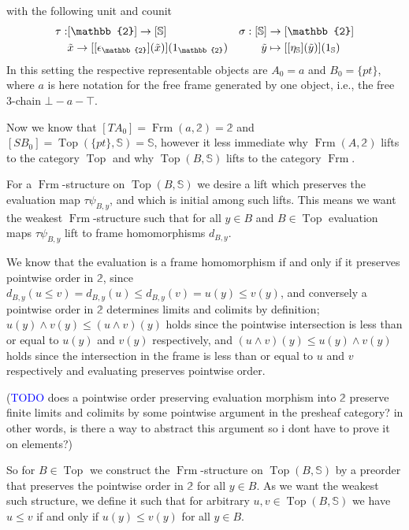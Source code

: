 \documentclass[12pt,a4paper]{article}
\DeclareMathOperator{\Frm}{Frm}
\DeclareMathOperator{\Top}{Top}
\def\t{\ensuremath\tilde}
\begin{document}
with the following unit and counit
\begin{align*}
	\tau:& [\mathbb{2}] \to [\mathbb{S}] & \sigma: [\mathbb{S}]&\to [\mathbb{2}]\\
	&\t x \to  [[\epsilon_{\mathbb{2}}](\t x)](1_{\mathbb{2}})&\t y &\mapsto [[\eta_{\mathbb{S}}](\t y)](1_{\mathbb{S}})
\end{align*}
In this setting  the respective representable objects are $A_0 = a$ and $B_0 = \{pt\}$, where $a$ is here  notation for the free frame generated by one object, i.e., the free 3-chain $\bot - a - \top$. 

Now we know that $[TA_0] = \Frm(a, \mathbb{2}) = \mathbb{2}$ and $[SB_0] = \Top(\{pt\}, \mathbb{S}) = \mathbb{S}$, however it less immediate  why $\Frm(A, \mathbb{2})$  lifts to the category $\Top$ and why $\Top(B, \mathbb{S})$ lifts to the category $\Frm$.

For a $\Frm$-structure on $\Top(B, \mathbb{S})$ we desire a lift which preserves the evaluation map $\tau\psi_{B,y}$, and which is initial among such lifts. This means we want the weakest $\Frm$-structure such that for all $y \in B$ and $B \in \Top$ evaluation maps $\tau \psi_{B,y}$ lift to frame homomorphisms $d_{B,y}$.

We know that the evaluation is a frame homomorphism if and only if it preserves pointwise order in $\mathbb{2}$, since   $d_{B,y}(u \leq v) = d_{B,y}(u) \leq d_{B,y}(v) = u(y) \leq v(y)$, and conversely a pointwise order in $\mathbb{2}$ determines limits and colimits by definition;  $u(y) \land v(y) \leq (u \land v)(y)$ holds since the pointwise intersection is less than or equal to $u(y)$ and $v(y)$ respectively, and $(u \land v)(y) \leq u(y) \land v(y)$ holds since the intersection in the frame is less than or equal to $u$ and $v$ respectively and  evaluating preserves pointwise order.
	

(\textcolor{blue}{TODO} does a pointwise order preserving evaluation morphism into $\mathbb{2}$ preserve finite limits and colimits by some pointwise argument in the presheaf category? in other words, is there a way to abstract this argument so i dont have to prove it on elements?)



So for $B \in \Top$ we construct the $\Frm$-structure on $\Top(B, \mathbb{S})$ by a preorder that preserves the pointwise order in $\mathbb{2}$ for all $y \in B$. As we want the weakest such structure, we define it such that for  arbitrary $ u, v \in \Top(B, \mathbb{S})$ we have $u \leq v$ if and only if $u(y) \leq v(y)$ for all $y \in B$. 
\end{document}
